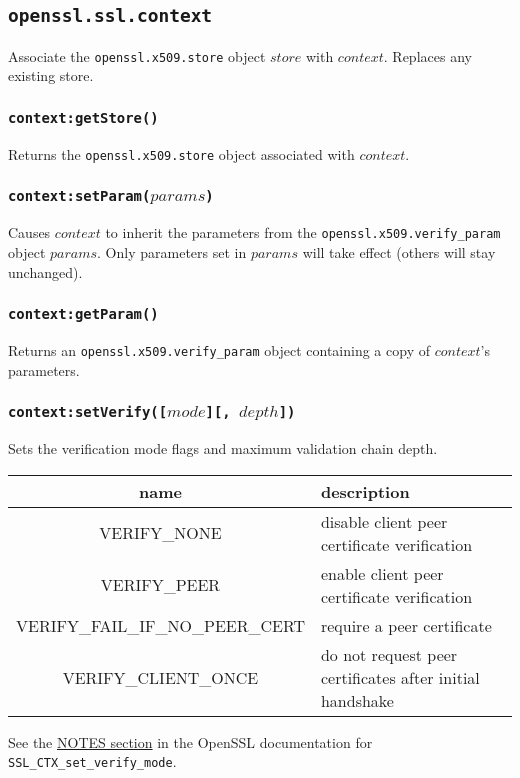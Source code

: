 \documentclass[11pt, oneside]{memoir}
\newcommand*{\fn}[1]{\texttt{#1}\xspace}
\newcommand*{\module}[1]{\texttt{#1}\xspace}
\newcounter{toccols}
\newenvironment{Module}[1]{
	\subsection{\texttt{#1}}
	\addtocontents{toc}{
		\protect\begin{multicols}{\value{toccols}}
	}
}{
	\addtocontents{toc}{\protect\end{multicols}}
}
\begin{document}
\begin{Module}{openssl.ssl.context}
Associate the \module{openssl.x509.store} object $store$ with $context$. Replaces any existing store.

\subsubsection[\fn{context:getStore}]{\fn{context:getStore()}}

Returns the \module{openssl.x509.store} object associated with $context$.

\subsubsection[\fn{context:setParam}]{\fn{context:setParam($params$)}}

Causes $context$ to inherit the parameters from the \module{openssl.x509.verify\_param} object $params$.
Only parameters set in $params$ will take effect (others will stay unchanged).

\subsubsection[\fn{context:getParam}]{\fn{context:getParam()}}

Returns an \module{openssl.x509.verify\_param} object containing a copy of $context$'s parameters.

\subsubsection[\fn{context:setVerify}]{\fn{context:setVerify([$mode$][, $depth$])}}

Sets the verification mode flags and maximum validation chain depth.

\begin{tabular}{ c | l }
name & description \\\hline
VERIFY\_NONE & disable client peer certificate verification \\
VERIFY\_PEER & enable client peer certificate verification \\
VERIFY\_FAIL\_IF\_NO\_PEER\_CERT & require a peer certificate \\
VERIFY\_CLIENT\_ONCE & do not request peer certificates after initial handshake
\end{tabular}

See the \href{http://www.openssl.org/docs/ssl/SSL_CTX_set_verify.html#NOTES}{NOTES section} in the OpenSSL documentation for \fn{SSL\_CTX\_set\_verify\_mode}.


\end{Module}
\end{document}
